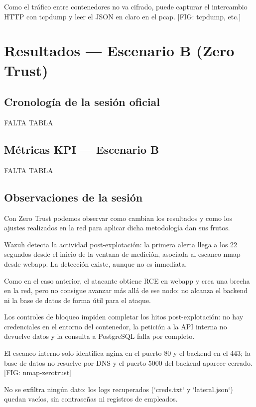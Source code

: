 \documentclass[11pt,spanish,listoffigures,listoftables]{tfgetsinf}
\begin{document}
        Como el tráfico entre contenedores no va cifrado, puede capturar el intercambio HTTP con tcpdump y leer el JSON en claro en el pcap. [FIG: tcpdump, etc.]

        
    \section{Resultados — Escenario B (Zero Trust)}
        \subsection{Cronología de la sesión oficial}
        FALTA TABLA
        
        \subsection{Métricas KPI — Escenario B}
        FALTA TABLA
        
        \subsection{Observaciones de la sesión}
        Con Zero Trust podemos observar como cambian los resultados y como los ajustes realizados en la red para aplicar dicha metodología dan sus frutos.

        Wazuh detecta la actividad post-explotación: la primera alerta llega a los 22 segundos desde el inicio de la ventana de medición, asociada al escaneo nmap desde webapp. La detección existe, aunque no es inmediata.
        
        Como en el caso anterior, el atacante obtiene RCE en webapp y crea una brecha en la red, pero no consigue avanzar más allá de ese nodo: no alcanza el backend ni la base de datos de forma útil para el ataque.
        
        Los controles de bloqueo impiden completar los hitos post-explotación: no hay credenciales en el entorno del contenedor, la petición a la API interna no devuelve datos y la consulta a PostgreSQL falla por completo.
        
        El escaneo interno solo identifica nginx en el puerto 80 y el backend en el 443; la base de datos no resuelve por DNS y el puerto 5000 del backend aparece cerrado. [FIG: nmap-zerotrust]
        
        No se exfiltra ningún dato: los logs recuperados (`creds.txt` y `lateral.json`) quedan vacíos, sin contraseñas ni registros de empleados.
        
\end{document}
